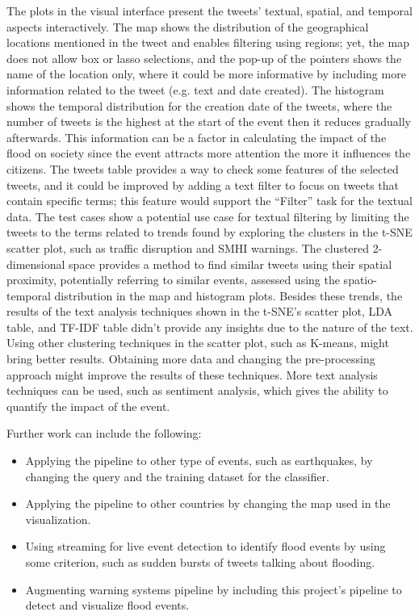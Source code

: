 The plots in the visual interface present the tweets' textual, spatial, and temporal aspects
interactively. The map shows the distribution of the geographical locations mentioned in the tweet
and enables filtering using regions; yet, the map does not allow box or lasso selections, and the
pop-up of the pointers shows the name of the location only, where it could be more informative by
including more information related to the tweet (e.g. text and date created). The histogram shows
the temporal distribution for the creation date of the tweets, where the number of tweets is the
highest at the start of the event then it reduces gradually afterwards. This information can be a
factor in calculating the impact of the flood on society since the event attracts more attention the
more it influences the citizens. The tweets table provides a way to check some features of the
selected tweets, and it could be improved by adding a text filter to focus on tweets that contain
specific terms; this feature would support the ``Filter'' task for the textual data. The test cases
show a potential use case for textual filtering by limiting the tweets to the terms related to
trends found by exploring the clusters in the \ac{t-SNE} scatter plot, such as traffic disruption
and \ac{SMHI} warnings. The clustered 2-dimensional space provides a method to find similar tweets
using their spatial proximity, potentially referring to similar events, assessed using the
spatio-temporal distribution in the map and histogram plots. Besides these trends, the results of
the text analysis techniques shown in the \ac{t-SNE}'s scatter plot, \ac{LDA} table, and \ac{TF-IDF}
table didn't provide any insights due to the nature of the text. Using other clustering techniques
in the scatter plot, such as K-means, might bring better results. Obtaining more data and changing
the pre-processing approach might improve the results of these techniques. More text analysis
techniques can be used, such as sentiment analysis, which gives the ability to quantify the impact
of the event.

Further work can include the following:
\begin{itemize}
  \item Applying the pipeline to other type of events, such as earthquakes, by changing the query
    and the training dataset for the classifier.
  \item Applying the pipeline to other countries by changing the map used in the visualization.
  \item Using streaming for live event detection to identify flood events by using some criterion,
    such as sudden bursts of tweets talking about flooding.
  \item Augmenting warning systems pipeline by including this project's pipeline to detect and visualize flood events.
\end{itemize}
